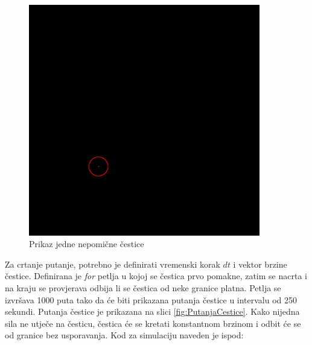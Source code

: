\documentclass{foi}
\begin{document}
\begin{figure}[H]
    \centering
    \includegraphics[width=0.9\textwidth]{slike/9_CesticaNaPlatnu.png}
    \captionsetup{justification=centering}
    \caption{Prikaz jedne nepomične čestice}
\label{fig:CesticaNaPlatnu}
\end{figure}

Za crtanje putanje, potrebno je definirati vremenski korak $dt$ i vektor brzine čestice. Definirana je \textit{for} petlja u kojoj se čestica prvo pomakne, zatim se nacrta i na kraju se provjerava odbija li se čestica od neke granice platna. Petlja se izvršava 1000 puta tako da će biti prikazana putanja čestice u intervalu od 250 sekundi. Putanja čestice je prikazana na slici \ref{fig:PutanjaCestice}. Kako nijedna sila ne utječe na česticu, čestica će se kretati konstantnom brzinom i odbit će se od granice bez usporavanja. Kod za simulaciju naveden je ispod:
\end{document}
